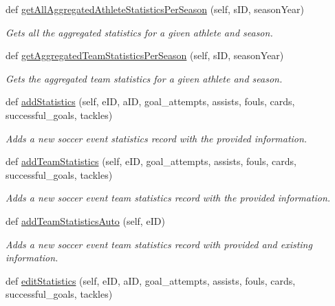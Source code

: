 \begin{DoxyCompactItemize}
def \hyperlink{classhandler_1_1dao_1_1soccer__event__dao_1_1_soccer_event_d_a_o_aa1ebbf9509867d1da215d75065baa6d2}{get\+All\+Aggregated\+Athlete\+Statistics\+Per\+Season} (self, s\+ID, season\+Year)
\begin{DoxyCompactList}\small\item\em Gets all the aggregated statistics for a given athlete and season. \end{DoxyCompactList}\item 
def \hyperlink{classhandler_1_1dao_1_1soccer__event__dao_1_1_soccer_event_d_a_o_a97953c45058d00a3ee288b84944f596c}{get\+Aggregated\+Team\+Statistics\+Per\+Season} (self, s\+ID, season\+Year)
\begin{DoxyCompactList}\small\item\em Gets the aggregated team statistics for a given athlete and season. \end{DoxyCompactList}\item 
def \hyperlink{classhandler_1_1dao_1_1soccer__event__dao_1_1_soccer_event_d_a_o_a77bff928a92d95d753d7a96f8d5d2253}{add\+Statistics} (self, e\+ID, a\+ID, goal\+\_\+attempts, assists, fouls, cards, successful\+\_\+goals, tackles)
\begin{DoxyCompactList}\small\item\em Adds a new soccer event statistics record with the provided information. \end{DoxyCompactList}\item 
def \hyperlink{classhandler_1_1dao_1_1soccer__event__dao_1_1_soccer_event_d_a_o_ae52586194d67b1cb7190947805ccb144}{add\+Team\+Statistics} (self, e\+ID, goal\+\_\+attempts, assists, fouls, cards, successful\+\_\+goals, tackles)
\begin{DoxyCompactList}\small\item\em Adds a new soccer event team statistics record with the provided information. \end{DoxyCompactList}\item 
def \hyperlink{classhandler_1_1dao_1_1soccer__event__dao_1_1_soccer_event_d_a_o_a5e0ab1f0101b17bd786d41d424fd19d9}{add\+Team\+Statistics\+Auto} (self, e\+ID)
\begin{DoxyCompactList}\small\item\em Adds a new soccer event team statistics record with provided and existing information. \end{DoxyCompactList}\item 
def \hyperlink{classhandler_1_1dao_1_1soccer__event__dao_1_1_soccer_event_d_a_o_af5db499bafc4bc551418eb8d7f3fce08}{edit\+Statistics} (self, e\+ID, a\+ID, goal\+\_\+attempts, assists, fouls, cards, successful\+\_\+goals, tackles)

\end{DoxyCompactItemize}
